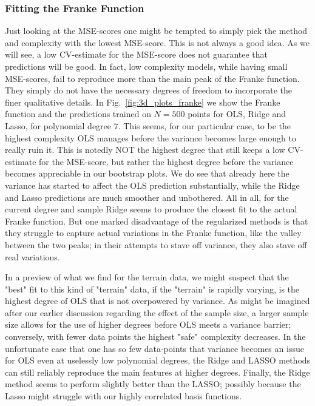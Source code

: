 \documentclass[reprint, english, nofootinbib]{revtex4-2}
\begin{document}
\subsubsection{Fitting the Franke Function}
\noindent
Just looking at the MSE-scores one might be tempted to simply pick the method and complexity with the lowest MSE-score. This is not always a good idea. As we will see, a low CV-estimate for the MSE-score does not guarantee that predictions will be good. In fact, low complexity models, while having small MSE-scores, fail to reproduce more than the main peak of the Franke function. They simply do not have the necessary degrees of freedom to incorporate the finer qualitative details. In Fig.~\ref{fig:3d_plots_franke} we show the Franke function and the predictions trained on $N=500$ points for OLS, Ridge and Lasso, for polynomial degree 7. This seems, for our particular case, to be the highest complexity OLS manages before the variance becomes large enough to really ruin it. This is notedly NOT the highest degree that still keeps a low CV-estimate for the MSE-score, but rather the highest degree before the variance becomes appreciable in our bootstrap plots. We do see that already here the variance has started to affect the OLS prediction substantially, while the Ridge and Lasso predictions are much smoother and unbothered. All in all, for the current degree and sample Ridge seems to produce the closest fit to the actual Franke function. But one marked disadvantage of the regularized methods is that they struggle to capture actual variations in the Franke function, like the valley between the two peaks; in their attempts to stave off variance, they also stave off real variations.

In a preview of what we find for the terrain data, we might suspect that the "best" fit to this kind of "terrain" data, if the "terrain" is rapidly varying, is the highest degree of OLS that is not overpowered by variance. As might be imagined after our earlier discussion regarding the effect of the sample size, a larger sample size allows for the use of higher degrees before OLS meets a variance barrier; conversely, with fewer data points the highest "safe" complexity decreases. In the unfortunate case that one has so few data-points that variance becomes an issue for OLS even at uselessly low polynomial degrees, the Ridge and LASSO methods can still reliably reproduce the main features at higher degrees. Finally, the Ridge method seems to perform slightly better than the LASSO; possibly because the Lasso might struggle with our highly correlated basis functions.
\end{document}
